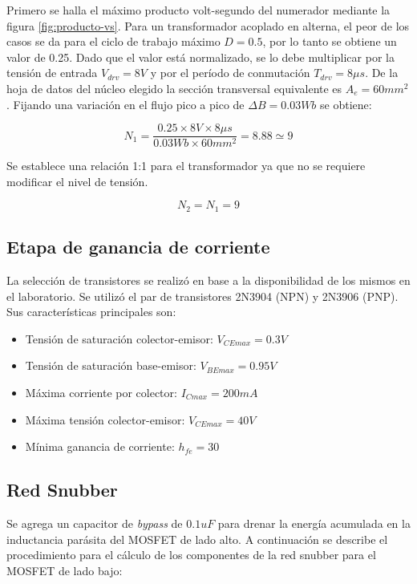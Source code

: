 Primero se halla el máximo producto volt-segundo del numerador mediante la figura \ref{fig:producto-vs}.
Para un transformador acoplado en alterna, el peor de los casos se da para el ciclo de trabajo máximo $D=0.5$, por lo tanto se obtiene un valor de 0.25. 
Dado que el valor está normalizado, se lo debe multiplicar por la tensión de entrada $V_{drv}=8V$ y por el período de conmutación $T_{drv}=8\mu s$.
De la hoja de datos del núcleo elegido la sección transversal equivalente es $A_{e}=60mm^2$. 
Fijando una variación en el flujo pico a pico de $\Delta B=0.03Wb$ se obtiene: 

$$ N_{1}=\frac {0.25\times 8V \times 8\mu s}{0.03Wb \times 60mm^2}=8.88\simeq 9 $$

Se establece una relación 1:1 para el transformador ya que no se requiere modificar el nivel de tensión.

$$ N_{2}=N_{1}=9 $$

\subsection{Etapa de ganancia de corriente}

La selección de transistores se realizó en base a la disponibilidad de los mismos en el laboratorio. Se utilizó el par de transistores 2N3904 (NPN) y 2N3906 (PNP). Sus características principales son:

\begin{itemize}
    \item Tensión de saturación colector-emisor: $V_{CEmax}=0.3V$
    \item Tensión de saturación base-emisor: $V_{BEmax}=0.95V$
    \item Máxima corriente por colector: $I_{Cmax}=200mA$
    \item Máxima tensión colector-emisor: $V_{CEmax}=40V$
    \item Mínima ganancia de corriente: $h_{fe}=30$
\end{itemize}

\subsection{Red Snubber}

Se agrega un capacitor de \textit{bypass} de $0.1uF$ para drenar la energía acumulada en la inductancia parásita del MOSFET de lado alto.   
A continuación se describe el procedimiento para el cálculo de los componentes de la red snubber para el MOSFET de lado bajo:

